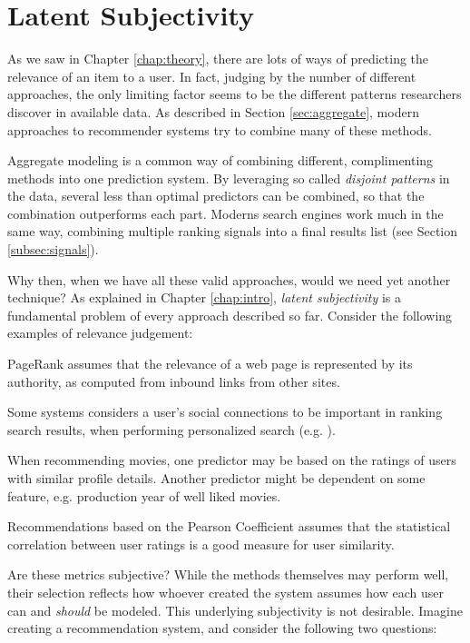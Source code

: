 \section{Latent Subjectivity}
\label{sec:reasoning}

As we saw in Chapter \ref{chap:theory}, 
there are lots of ways of predicting the
relevance of an item to a user. 
In fact, judging by the number of different approaches,
the only limiting factor seems to be the different 
patterns researchers discover in available data.
As described in Section \ref{sec:aggregate},
modern approaches to recommender systems try to combine many of these methods.

Aggregate modeling is a common way of combining different, complimenting
methods into one prediction system.
By leveraging so called \emph{disjoint patterns}
in the data, several less than optimal predictors
can be combined, so that the combination outperforms each part.
Moderns search engines work much in the same way,
combining multiple ranking signals into a final results list
(see Section \ref{subsec:signals}).

Why then, when we have all these valid approaches, would we need yet another technique?
As explained in Chapter \ref{chap:intro}, \emph{latent subjectivity}
is a fundamental problem of every approach described so far.
Consider the following examples of relevance judgement:

\begin{itemize*}
  \item PageRank \citep{Bender2005} assumes that the relevance of a web page is 
  represented by its authority, as computed from inbound links from other sites.
  \item Some systems considers a user's social connections to be important
  in ranking search results, when performing personalized search (e.g. \cite{Carmel2009}).
  \item When recommending movies, one predictor may be based on the ratings
  of users with similar profile details. Another predictor might be 
  dependent on some feature, e.g. production year of well liked movies.
  \item Recommendations based on the Pearson Coefficient \cite[p11]{Segaran2007}
  assumes that the statistical correlation between user ratings is a good
  measure for user similarity.
\end{itemize*}

Are these metrics subjective? 
While the methods themselves may perform well, their selection
reflects how whoever created the system assumes how each user
can and \emph{should} be modeled. This underlying subjectivity is not desirable.
Imagine creating a recommendation system, and consider the following two questions:

